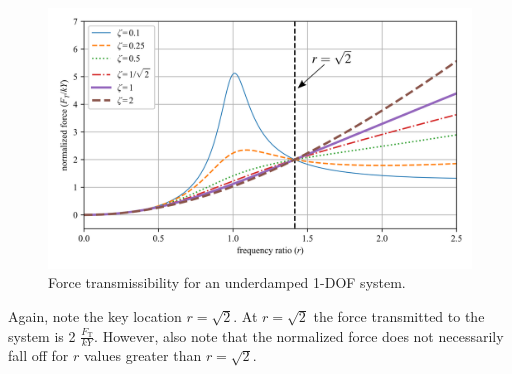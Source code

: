 \documentclass[12pt,letter]{article}
\numberwithin{ex}{section} %
\numberwithin{re}{section} %
\begin{document}
				\begin{figure}[H]
					\centering
					\includegraphics[]{../Figures/base_excitation_force_transmissibility.png}
					\caption{Force transmissibility for an underdamped 1-DOF system.}
				\end{figure}
				Again, note the key location $r=\sqrt{2}$. At $r=\sqrt{2}$ the force transmitted to the system is 2 $\frac{F_\text{T}}{kY}$. However, also note that the normalized force does not necessarily fall off for $r$ values greater than $r=\sqrt{2}$.  
	
\end{document}
